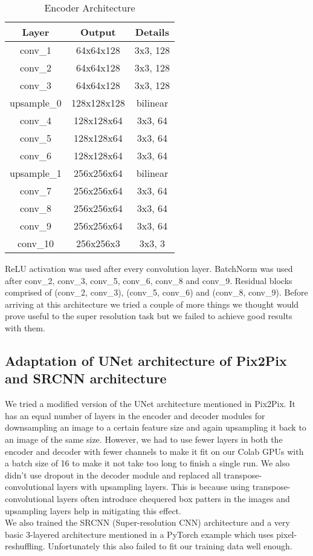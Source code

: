 \documentclass[11pt,a4paper]{article}
\begin{document}
\begin{table}[h]
\begin{center}
\begin{tabular}{|c|c|c|}
\hline \textbf{Layer} & \textbf{Output} & \textbf{Details} \\ \hline
conv\_1 & 64x64x128 & 3x3, 128 \\
conv\_2 & 64x64x128 & 3x3, 128\\
conv\_3 & 64x64x128 & 3x3, 128\\
upsample\_0 & 128x128x128 & bilinear\\
conv\_4 & 128x128x64 & 3x3, 64\\
conv\_5 & 128x128x64 & 3x3, 64\\
conv\_6 & 128x128x64 & 3x3, 64\\
upsample\_1 & 256x256x64 & bilinear\\
conv\_7 & 256x256x64 & 3x3, 64\\
conv\_8 & 256x256x64 & 3x3, 64\\
conv\_9 & 256x256x64 & 3x3, 64\\
conv\_{10} & 256x256x3 & 3x3, 3\\
\hline
\end{tabular}
\end{center}
\caption{\label{encoder} Encoder Architecture }
\end{table}
ReLU activation was used after every convolution layer. BatchNorm was used after conv\_2, conv\_3, conv\_5, conv\_6, conv\_8 and conv\_9. Residual blocks comprised of (conv\_2, conv\_3), (conv\_5, conv\_6) and (conv\_8, conv\_9).
Before arriving at this architecture we tried a couple of more things we thought would prove useful to the super resolution task but we failed to achieve good results with them.

\subsection{Adaptation of UNet architecture of Pix2Pix and SRCNN architecture}
We tried a modified version of the UNet architecture mentioned in Pix2Pix. It has an equal number of layers in the encoder and decoder modules for downsampling an image to a certain feature size and again upsampling it back to an image of the same size. However, we had to use fewer layers in both the encoder and decoder with fewer channels to make it fit on our Colab GPUs with a batch size of 16 to make it not take too long to finish a single run. We also didn't use dropout in the decoder module and replaced all transpose-convolutional layers with upsampling layers. This is because using transpose-convolutional layers often introduce chequered box patters in the images and upsampling layers help in mitigating this effect. 
\\We also trained the SRCNN (Super-resolution CNN) architecture and a very basic 3-layered architecture mentioned in a PyTorch example which uses pixel-reshuffling. Unfortunately this also failed to fit our training data well enough.
\end{document}
